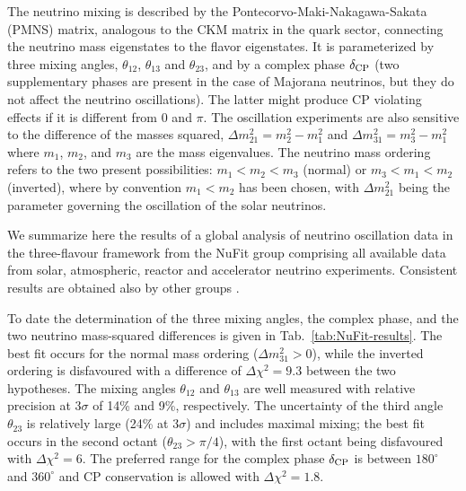 

The neutrino mixing is described by the Pontecorvo-Maki-Nakagawa-Sakata (PMNS) matrix, analogous to the CKM matrix in the quark sector, connecting the neutrino mass eigenstates to the flavor eigenstates. It is parameterized by three mixing angles, $\theta_{12}$, $\theta_{13}$ and  $\theta_{23}$, and by a complex phase $\delta_{\rm CP}$ (two supplementary phases are present in the case of Majorana neutrinos, but they do not affect the neutrino oscillations). The latter might produce CP violating effects if it is different from 0 and $\pi$. The oscillation experiments are also sensitive to the difference of the masses squared, $\Delta m^2_{21}= m^2_2 -m^2_1$ and $\Delta m^2_{31}= m^2_3 -m^2_1$
where $m_1$, $m_2$, and $m_3$ are the  mass eigenvalues. The neutrino mass ordering refers to the two present possibilities: $m_1 < m_2 < m_3$ (normal) or $m_3 < m_1 < m_2$ (inverted), where by convention $m_1 < m_2$ has been chosen, with $\Delta m^2_{21}$ being the parameter governing the oscillation of the solar neutrinos.


We summarize here the results of a global analysis of neutrino oscillation data in the three-flavour framework from the NuFit group \cite{Esteban:2018azc} comprising all available data from solar, atmospheric, reactor and accelerator neutrino experiments. Consistent results are obtained also by other groups \cite{Capozzi:2018ubv,lisi:2019EPSSU_Granada,deSalas:2017kay}. 


To date the determination of the three mixing angles, the complex phase, and the two neutrino mass-squared differences is given in Tab.~\ref{tab:NuFit-results}. The best fit occurs for the normal mass ordering ($\Delta m^2_{31} > 0$), while the inverted ordering is disfavoured with a difference of $\Delta \chi^2 = 9.3$ between the two hypotheses. %
The mixing angles $\theta_{12}$ and $\theta_{13}$ are well measured with relative precision at $3\sigma$ of 14\% and 9\%, respectively. The uncertainty of the third angle $\theta_{23}$ is relatively large (24\% at $3\sigma$) and includes maximal mixing; the best fit occurs in the second octant ($\theta_{23} > \pi/4$), with the first octant being disfavoured with $\Delta\chi^2 = 6$. The preferred range for the complex phase $\delta_{\rm CP}$ is between $180^\circ$ and $360^\circ$ and CP conservation is allowed with $\Delta\chi^2 = 1.8$.

